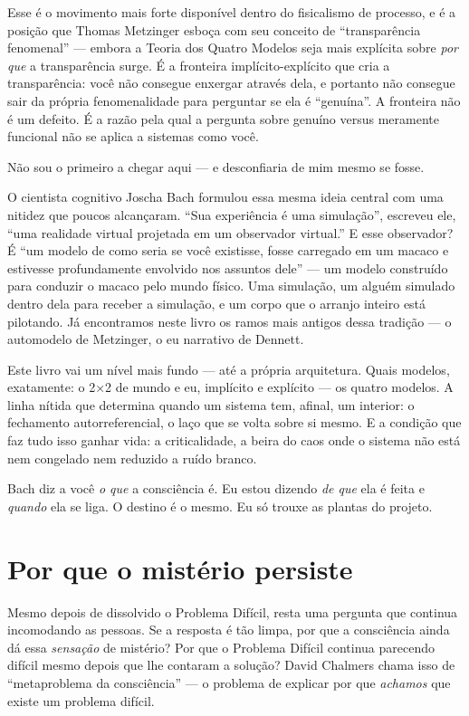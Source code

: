 \documentclass[11pt, twoside, openright]{book}
\begin{document}
Esse é o movimento mais forte disponível dentro do fisicalismo de processo, e é a posição que Thomas Metzinger esboça com seu conceito de ``transparência fenomenal'' --- embora a Teoria dos Quatro Modelos seja mais explícita sobre \textit{por que} a transparência surge. É a fronteira implícito-explícito que cria a transparência: você não consegue enxergar através dela, e portanto não consegue sair da própria fenomenalidade para perguntar se ela é ``genuína''. A fronteira não é um defeito. É a razão pela qual a pergunta sobre genuíno versus meramente funcional não se aplica a sistemas como você.

Não sou o primeiro a chegar aqui --- e desconfiaria de mim mesmo se fosse.

O cientista cognitivo Joscha Bach formulou essa mesma ideia central com uma nitidez que poucos alcançaram. ``Sua experiência é uma simulação'', escreveu ele, ``uma realidade virtual projetada em um observador virtual.'' E esse observador? É ``um modelo de como seria se você existisse, fosse carregado em um macaco e estivesse profundamente envolvido nos assuntos dele'' --- um modelo construído para conduzir o macaco pelo mundo físico. Uma simulação, um alguém simulado dentro dela para receber a simulação, e um corpo que o arranjo inteiro está pilotando. Já encontramos neste livro os ramos mais antigos dessa tradição --- o automodelo de Metzinger, o eu narrativo de Dennett.

Este livro vai um nível mais fundo --- até a própria arquitetura. Quais modelos, exatamente: o 2×2 de mundo e eu, implícito e explícito --- os quatro modelos. A linha nítida que determina quando um sistema tem, afinal, um interior: o fechamento autorreferencial, o laço que se volta sobre si mesmo. E a condição que faz tudo isso ganhar vida: a criticalidade, a beira do caos onde o sistema não está nem congelado nem reduzido a ruído branco.

Bach diz a você \textit{o que} a consciência é. Eu estou dizendo \textit{de que} ela é feita e \textit{quando} ela se liga. O destino é o mesmo. Eu só trouxe as plantas do projeto.

\section*{Por que o mistério persiste}

Mesmo depois de dissolvido o Problema Difícil, resta uma pergunta que continua incomodando as pessoas. Se a resposta é tão limpa, por que a consciência ainda dá essa \textit{sensação} de mistério? Por que o Problema Difícil continua parecendo difícil mesmo depois que lhe contaram a solução? David Chalmers chama isso de ``metaproblema da consciência'' --- o problema de explicar por que \textit{achamos} que existe um problema difícil.
\end{document}

